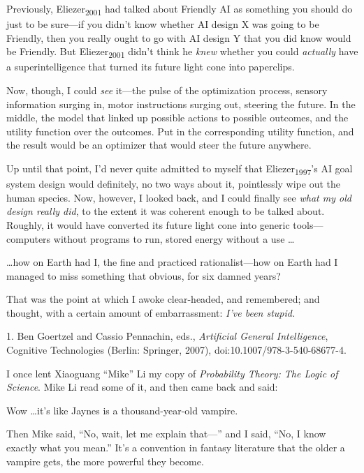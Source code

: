{
 Previously, Eliezer\textsubscript{2001} had talked about Friendly
AI as something you should do just to be sure---if you
didn't know whether AI design X was going to be
Friendly, then you really ought to go with AI design Y that you did
know would be Friendly. But Eliezer\textsubscript{2001}
didn't think he \textit{knew} whether you could
\textit{actually} have a superintelligence that turned its future light
cone into paperclips.}

{
 Now, though, I could \textit{see} it---the pulse of the
optimization process, sensory information surging in, motor
instructions surging out, steering the future. In the middle, the model
that linked up possible actions to possible outcomes, and the utility
function over the outcomes. Put in the corresponding utility function,
and the result would be an optimizer that would steer the future
anywhere.}

{
 Up until that point, I'd never quite admitted to
myself that Eliezer\textsubscript{1997}'s AI goal
system design would definitely, no two ways about it, pointlessly wipe
out the human species. Now, however, I looked back, and I could finally
see \textit{what my old design really did}, to the extent it was
coherent enough to be talked about. Roughly, it would have converted
its future light cone into generic tools---computers without programs
to run, stored energy without a use \ldots}

{
 \ldots how on Earth had I, the fine and practiced rationalist---how
on Earth had I managed to miss something that obvious, for six damned
years?}

{
 That was the point at which I awoke clear-headed, and remembered;
and thought, with a certain amount of embarrassment:
\textit{I've been stupid.}}

\myendsectiontext


\bigskip

{
 1. Ben Goertzel and Cassio Pennachin, eds., \textit{Artificial
General Intelligence}, Cognitive Technologies (Berlin: Springer, 2007),
doi:10.1007/978-3-540-68677-4.}


{
 I once lent Xiaoguang ``Mike''
Li my copy of \textit{Probability Theory: The Logic of Science}. Mike
Li read some of it, and then came back and said:}

{
 Wow \ldots it's like Jaynes is a thousand-year-old
vampire.}

{
 Then Mike said, ``No, wait, let me explain
that---'' and I said, ``No, I know
exactly what you mean.'' It's a
convention in fantasy literature that the older a vampire gets, the
more powerful they become.}

